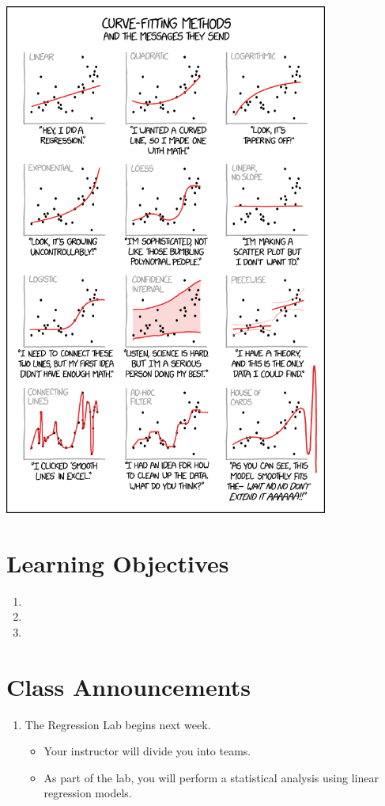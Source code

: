 \documentclass[
]{book}
\providecommand{\tightlist}{%
  \setlength{\itemsep}{0pt}\setlength{\parskip}{0pt}}
\theoremstyle{definition}
\theoremstyle{definition}
\theoremstyle{definition}
\theoremstyle{definition}
\theoremstyle{remark}
\begin{document}
\includegraphics[width=0.8\textwidth,height=\textheight]{./images/curve_fitting.png}

\hypertarget{learning-objectives-9}{%
\section{Learning Objectives}\label{learning-objectives-9}}

\begin{enumerate}
\def\labelenumi{\arabic{enumi}.}
\tightlist
\item
\item
\item
\end{enumerate}

\hypertarget{class-announcements-8}{%
\section{Class Announcements}\label{class-announcements-8}}

\begin{enumerate}
\def\labelenumi{\arabic{enumi}.}
\tightlist
\item
  The Regression Lab begins next week.

  \begin{itemize}
  \tightlist
  \item
    Your instructor will divide you into teams.
  \item
    As part of the lab, you will perform a statistical analysis using linear regression models.
  \end{itemize}
\end{enumerate}
\end{document}
